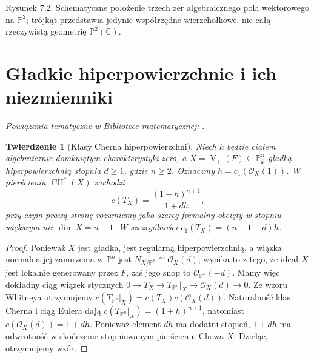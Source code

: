 \documentclass[11pt,a4paper,openany]{report}
\numberwithin{equation}{section}
\theoremstyle{plain}
\newtheorem{twierdzenie}{Twierdzenie}[section]
\theoremstyle{definition}
\theoremstyle{remark}
\newcommand{\C}{\mathbb C}
\newcommand{\PP}{\mathbb P}
\newcommand{\V}{\operatorname V}
\begin{document}
\begin{center}
\begin{minipage}{\linewidth}
\centering
{}

{\small Rysunek 7.2. Schematyczne położenie trzech zer algebraicznego pola wektorowego na $\PP^2$; trójkąt przedstawia jedynie współrzędne wierzchołkowe, nie całą rzeczywistą geometrię $\PP^2(\C)$.}
\end{minipage}
\end{center}

\section{Gładkie hiperpowierzchnie i ich niezmienniki}
\label{sec:ga7-hypersurfaces}

\noindent\emph{Powiązania tematyczne w Bibliotece matematycznej:} .


\begin{twierdzenie}[Klasy Cherna hiperpowierzchni]
\label{tw:ga7-hypersurface-chern}
Niech $k$ będzie ciałem algebraicznie domkniętym
charakterystyki zero, a $X=\V_+(F)\subseteq\PP^n_k$
gładką hiperpowierzchnią stopnia $d\ge1$, gdzie $n\ge2$.
Oznaczmy $h=c_1(\mathcal O_X(1))$.
W pierścieniu $\operatorname{CH}^*(X)$ zachodzi
\[
 c(T_X)=\frac{(1+h)^{n+1}}{1+dh},
\]
przy czym prawą stronę rozumiemy jako szereg formalny
obcięty w stopniu większym niż $\dim X=n-1$.
W szczególności $c_1(T_X)=(n+1-d)h$.
\end{twierdzenie}
\begin{proof}
Ponieważ $X$ jest gładka, jest regularną hiperpowierzchnią,
a wiązka normalna jej zanurzenia w $\PP^n$ jest
$N_{X/\PP^n}\cong\mathcal O_X(d)$; wynika to
z tego, że ideał $X$ jest lokalnie generowany przez $F$,
zaś jego snop to $\mathcal O_{\PP^n}(-d)$.
Mamy więc dokładny ciąg wiązek stycznych
$0\to T_X\to T_{\PP^n}|_X\to\mathcal O_X(d)\to0$.
Ze wzoru Whitneya otrzymujemy
$c(T_{\PP^n}|_X)=c(T_X)c(\mathcal O_X(d))$.
Naturalność klas Cherna i ciąg Eulera dają
$c(T_{\PP^n}|_X)=(1+h)^{n+1}$, natomiast
$c(\mathcal O_X(d))=1+dh$.
Ponieważ element $dh$ ma dodatni stopień, $1+dh$
ma odwrotność w skończenie stopniowanym pierścieniu
Chowa $X$. Dzieląc, otrzymujemy wzór.
\end{proof}
\end{document}
